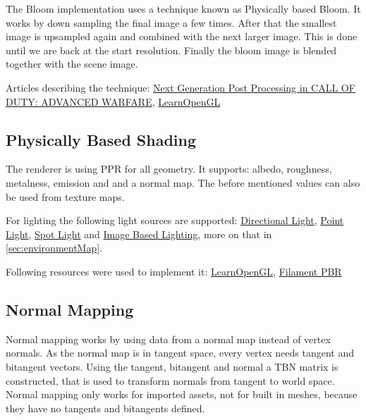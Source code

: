 \documentclass{article}
\begin{document}
    The Bloom implementation uses a technique known as Physically based Bloom. It works by down sampling the final image a few times. After that the smallest image is upsampled  again and combined with the next larger image. This is done until we are back at the start resolution. Finally the bloom image is blended together with the scene image.

    Articles describing the technique: \href{https://www.iryoku.com/next-generation-post-processing-in-call-of-duty-advanced-warfare}{Next Generation Post Processing in CALL OF DUTY: ADVANCED WARFARE}, \href{https://learnopengl.com/Guest-Articles/2022/Phys.-Based-Bloom}{LearnOpenGL}

    \subsection{Physically Based Shading}

    The renderer is using PPR for all geometry. It supports: albedo, roughness, metalness, emission and and a normal map. The before mentioned values can also be used from texture maps.

    For lighting the following light sources are supported: \href{https://github.com/Liioooo/cgue23-pac3D/blob/master/docs/md/COMPONENTS_DOCS.md#directionallightcomponent}{Directional Light}, \href{https://github.com/Liioooo/cgue23-pac3D/blob/master/docs/md/COMPONENTS_DOCS.md#directionallightcomponent}{Point Light}, \href{https://github.com/Liioooo/cgue23-pac3D/blob/master/docs/md/COMPONENTS_DOCS.md#directionallightcomponent}{Spot Light} and \href{https://github.com/Liioooo/cgue23-pac3D/blob/master/docs/md/COMPONENTS_DOCS.md#directionallightcomponent}{Image Based Lighting}, more on that in \ref{sec:environmentMap}.

    Following resources were used to implement it: \href{https://learnopengl.com/PBR/Theory}{LearnOpenGL}, \href{https://google.github.io/filament/Filament.md.html}{Filament PBR}

    \subsection{Normal Mapping}

    Normal mapping works by using data from a normal map instead of vertex normals. As the normal map is in tangent space, every vertex needs tangent and bitangent vectors. Using the tangent, bitangent and normal a TBN matrix is constructed, that is used to transform normals from tangent to world space. Normal mapping only works for imported assets, not for built in meshes, because they have no tangents and bitangents defined.
\end{document}
